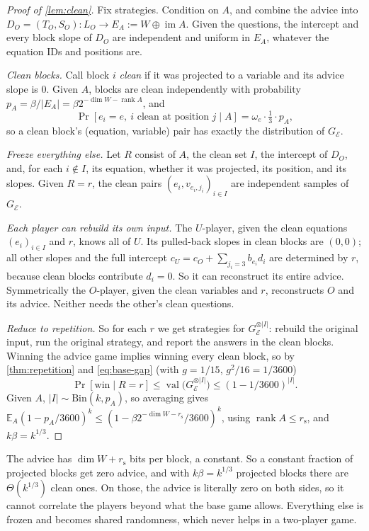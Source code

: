 \documentclass[11pt]{article}
\theoremstyle{definition}
\theoremstyle{remark}
\newcommand{\E}{\mathbb E}
\newcommand{\cE}{\mathcal E}
\newcommand{\rs}{r_{\mathrm s}}
\DeclareMathOperator{\val}{val}
\DeclareMathOperator{\im}{im}
\DeclareMathOperator{\rank}{rank}
\newcommand{\abs}[1]{\lvert #1\rvert}
\begin{document}
\begin{proof}[Proof of \cref{lem:clean}]
Fix strategies. Condition on $A$, and combine the advice into
$D_O=(T_O,S_O)\colon L_O\to E_A:=W\oplus\im A$. Given the questions, the
intercept and every block slope of $D_O$ are independent and uniform in $E_A$,
whatever the equation IDs and positions are.

\emph{Clean blocks.} Call block $i$ \emph{clean} if it was projected to a
variable and its advice slope is $0$. Given $A$, blocks are clean independently
with probability $p_A=\beta/\abs{E_A}=\beta2^{-\dim W-\rank A}$, and
\[
\Pr[e_i=e,\ i\text{ clean at position }j\mid A]=\omega_e\cdot\tfrac13\cdot p_A,
\]
so a clean block's (equation, variable) pair has exactly the distribution of
$G_\cE$.

\emph{Freeze everything else.} Let $R$ consist of $A$, the clean set $I$, the
intercept of $D_O$, and, for each $i\notin I$, its equation, whether it was
projected, its position, and its slopes. Given $R=r$, the clean pairs
$(e_i,v_{e_i,j_i})_{i\in I}$ are independent samples of $G_\cE$.

\emph{Each player can rebuild its own input.} The $U$-player, given the clean
equations $(e_i)_{i\in I}$ and $r$, knows all of $U$. Its pulled-back slopes in
clean blocks are $(0,0)$; all other slopes and the full intercept
$c_U=c_O+\sum_{j_i=3}b_{e_i}d_i$ are determined by $r$, because clean blocks
contribute $d_i=0$. So it can reconstruct its entire advice. Symmetrically the
$O$-player, given the clean variables and $r$, reconstructs $O$ and its advice.
Neither needs the other's clean questions.

\emph{Reduce to repetition.} So for each $r$ we get strategies for
$G_\cE^{\otimes\abs I}$: rebuild the original input, run the original strategy,
and report the answers in the clean blocks. Winning the advice game implies
winning every clean block, so by \cref{thm:repetition} and \eqref{eq:base-gap}
(with $g=1/15$, $g^2/16=1/3600$)
\[
\Pr[\text{win}\mid R=r]\le\val\bigl(G_\cE^{\otimes\abs I}\bigr)\le(1-1/3600)^{\abs I}.
\]
Given $A$, $\abs I\sim\mathrm{Bin}(k,p_A)$, so averaging gives
$\E_A(1-p_A/3600)^k\le(1-\beta2^{-\dim W-\rs}/3600)^k$, using $\rank A\le\rs$,
and $k\beta=k^{1/3}$.
\end{proof}

\begin{idea}
The advice has $\dim W+\rs$ bits per block, a constant. So a constant fraction
of projected blocks get zero advice, and with $k\beta=k^{1/3}$ projected blocks
there are $\Theta(k^{1/3})$ clean ones. On those, the advice is literally zero
on both sides, so it cannot correlate the players beyond what the base game
allows. Everything else is frozen and becomes shared randomness, which never
helps in a two-player game.
\end{idea}
\end{document}
